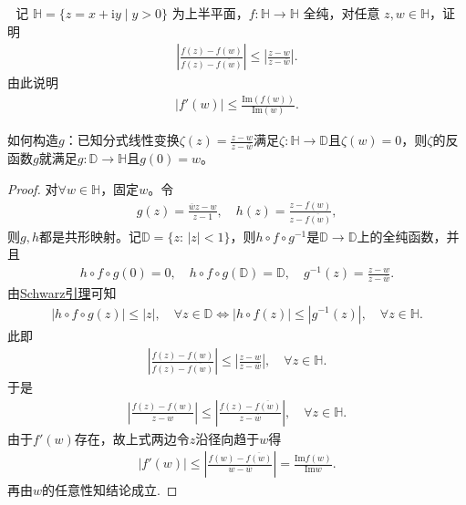 \documentclass[../../main.tex]{subfiles}%
\begin{document}
\begin{example}\,\,
记 $\mathbb{H} = \{z = x + \mathrm{i}y \mid y > 0\}$ 为上半平面，$f:\mathbb{H} \to \mathbb{H}$ 全纯，对任意 $z,w \in \mathbb{H}$，证明
\begin{align*}
\left|\frac{f(z)-f(w)}{f(z)-\overline{f(w)}}\right| \leqslant \left|\frac{z-w}{z-\overline{w}}\right|.
\end{align*}
由此说明
\begin{align*}
|f'(w)| \leqslant \frac{\mathrm{Im}(f(w))}{\mathrm{Im}(w)}.
\end{align*}
\end{example}
\begin{remark}
如何构造$g$：已知分式线性变换$\zeta(z)=\frac{z-w}{z-\overline{w}}$满足$\zeta:\mathbb{H}\to\mathbb{D}$且$\zeta(w)=0$，则$\zeta$的反函数$g$就满足$g:\mathbb{D}\to\mathbb{H}$且$g(0)=w$。
\end{remark}
\begin{proof}
对$\forall w\in\mathbb{H}$，固定$w$。令
\begin{align*}
g(z)=\frac{\overline{w}z-w}{z-1},\quad h(z)=\frac{z-f(w)}{z-\overline{f(w)}},
\end{align*}
则$g,h$都是共形映射。记$\mathbb{D}=\{z:\,|z|<1\}$，则$h\circ f\circ g^{-1}$是$\mathbb{D}\to\mathbb{D}$上的全纯函数，并且
\begin{align*}
h\circ f\circ g(0)=0,\quad h\circ f\circ g(\mathbb{D})=\mathbb{D},\quad g^{-1}(z)=\frac{z-w}{z-\overline{w}}.
\end{align*}
由\hyperref[theorem:Schwarz引理-定理4.5.3]{Schwarz引理}可知
\begin{align*}
|h\circ f\circ g(z)|\leqslant|z|,\quad \forall z\in\mathbb{D} \Longleftrightarrow |h\circ f(z)|\leqslant|g^{-1}(z)|,\quad \forall z\in\mathbb{H}.
\end{align*}
此即
\begin{align*}
\left| \frac{f(z)-f(w)}{f(z)-\overline{f(w)}} \right|\leqslant\left| \frac{z-w}{z-\overline{w}} \right|,\quad \forall z\in\mathbb{H}.
\end{align*}
于是
\begin{align*}
\left| \frac{f(z)-f(w)}{z-w} \right|\leqslant\left| \frac{f(z)-\overline{f(w)}}{z-\overline{w}} \right|,\quad \forall z\in\mathbb{H}.
\end{align*}
由于$f'(w)$存在，故上式两边令$z$沿径向趋于$w$得
\begin{align*}
|f'(w)|\leqslant\left| \frac{f(w)-\overline{f(w)}}{w-\overline{w}} \right|=\frac{\mathrm{Im}f(w)}{\mathrm{Im}w}.
\end{align*}
再由$w$的任意性知结论成立.
\end{proof}
\end{document}
